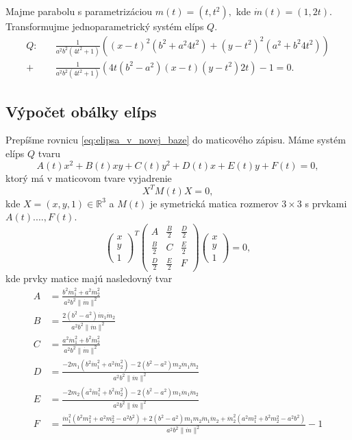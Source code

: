 \begin{example}[Parabola]
Majme parabolu s parametrizáciou $m(t)=(t, t^2), $ kde $\dot{m}(t)=(1, 2t).$ Transformujme jednoparametrický systém elíps $Q$.
\begin{align*}
Q: \quad &\frac{1}{a^{2} b^{2}\left(4 t^{2} + 1\right)} \left( (x-t)^2 (b^2 + a^{2} 4t^2) + (y-t^2)^2 (a^2 + b^2 4t^2) \right)\\
+ &\frac{1}{a^{2} b^{2}\left(4 t^{2} + 1\right)} \left( 4t(b^2 - a^2)(x-t)(y-t^2)2t \right) - 1 = 0.
\end{align*}
\end{example}

\subsection{Výpočet obálky elíps}
Prepíšme rovnicu \ref{eq:elipsa_v_novej_baze} do maticového zápisu. Máme systém elíps $Q$ tvaru $$
A(t)x^2 + B(t)xy + C(t)y^2 + D(t)x + E(t)y + F(t) = 0,$$
ktorý má v maticovom tvare vyjadrenie $$
X^TM(t)X = 0,
$$ kde $X=(x, y, 1) \in \mathbb{R}^3$ a $M(t)$ je symetrická matica rozmerov $3 \times 3$ s prvkami $A(t). \dots, F(t) $.
$$
\left(\begin{matrix} x \\ y \\ 1 
\end{matrix} \right)^T \left(\begin{matrix} 
A & \frac{B}{2} & \frac{D}{2} \\
\frac{B}{2} & C & \frac{E}{2} \\
\frac{D}{2} & \frac{E}{2} & F 
\end{matrix} \right)\left(\begin{matrix} x \\ y \\ 1 
\end{matrix} \right) = 0, 
$$
kde prvky matice majú nasledovný tvar
\begin{align*}
A &= \frac{b^2 \dot{m}_1^2 + a^2 \dot{m}_2^2}{a^2b^2 \| \dot{m} \|^2} \\
B &= \frac{2(b^2-a^2)\dot{m}_1 \dot{m}_2}{a^2b^2 \| \dot{m} \|^2} \\
C &= \frac{a^2 \dot{m}_1^2 + b^2 \dot{m}_2^2}{a^2b^2\| \dot{m} \|^2} \\
D &= \frac{- 2m_1 \left( b^2 \dot{m}_1^2 + a^2 \dot{m}_2^2 \right) - 2 \left(b^2 - a^2 \right) m_2 \dot{m}_1 \dot{m}_2 }{a^2b^2\| \dot{m} \|^2} \\
E &= \frac{- 2m_2 \left( a^2 \dot{m}_1^2 + b^2 \dot{m}_2^2 \right) - 2 \left(b^2 - a^2 \right) m_1 \dot{m}_1 \dot{m}_2 }{a^2b^2\| \dot{m} \|^2} \\
F &= \frac{\dot{m}_1^2 (b^2 m_1^2 + a^2 m_2^2 - a^2b^2) + 2 (b^2 - a^2) m_1 m_2 \dot{m}_1 \dot{m}_2 + \dot{m}_2^2 (a^2 m_1^2 + b^2 m_2^2 - a^2b^2) }{a^2b^2\| \dot{m}  \|^2}  -  1  \\
\end{align*}
